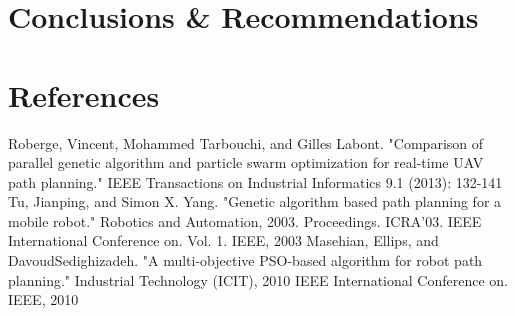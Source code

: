 \documentclass[conference]{IEEEtran}
\begin{document}
\section{Conclusions \& Recommendations}
\blindtext

\section*{References}

\begin{thebibliography}{00}
 Roberge, Vincent, Mohammed Tarbouchi, and Gilles Labont. "Comparison of parallel genetic algorithm and particle swarm optimization for real-time UAV path planning." IEEE Transactions on Industrial Informatics 9.1 (2013): 132-141
 Tu, Jianping, and Simon X. Yang. "Genetic algorithm based path planning for a mobile robot." Robotics and Automation, 2003. Proceedings. ICRA'03. IEEE International Conference on. Vol. 1. IEEE, 2003
 Masehian, Ellips, and DavoudSedighizadeh. "A multi-objective PSO-based algorithm for robot path planning." Industrial Technology (ICIT), 2010 IEEE International Conference on. IEEE, 2010
\end{thebibliography}
\end{document}
